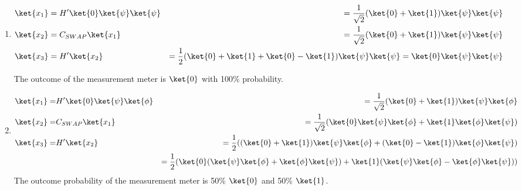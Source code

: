\documentclass[12pt]{article}
\begin{document}
\begin{enumerate}

\item %
\begin{eqnarray*}
\ket{x_1} & = H'\ket{0}\ket{\psi}\ket{\psi} & = \normtwo(\ket{0} + \ket{1})\ket{\psi}\ket{\psi}\\
\ket{x_2} & = C_{SWAP}\ket{x_1} & = \normtwo(\ket{0} + \ket{1})\ket{\psi}\ket{\psi}\\
\ket{x_3} & = H'\ket{x_2} & = \frac{1}{2}(\ket{0} + \ket{1} + \ket{0} - \ket{1})\ket{\psi}\ket{\psi} = \ket{0}\ket{\psi}\ket{\psi}
\end{eqnarray*}

The outcome of the measurement meter is $\ket{0}$ with 100\% probability.

\item %
\begin{eqnarray*}
\ket{x_1} = & H'\ket{0}\ket{\psi}\ket{\phi} & = \normtwo(\ket{0} + \ket{1})\ket{\psi}\ket{\phi}\\
\ket{x_2} = & C_{SWAP}\ket{x_1} & = \normtwo(\ket{0}\ket{\psi}\ket{\phi} + \ket{1}\ket{\phi}\ket{\psi})\\
\ket{x_3} = & H'\ket{x_2} & = \frac{1}{2}((\ket{0} + \ket{1})\ket{\psi}\ket{\phi} + (\ket{0} - \ket{1})\ket{\phi}\ket{\psi})\\
& & =
\frac{1}{2}(\ket{0}(\ket{\psi}\ket{\phi} + \ket{\phi}\ket{\psi}) + \ket{1}(\ket{\psi}\ket{\phi} - \ket{\phi}\ket{\psi}))\end{eqnarray*}
%
The outcome probability of the measurement meter is 50\% $\ket{0}$
and 50\% $\ket{1}$.


\end{enumerate}
\end{document}
